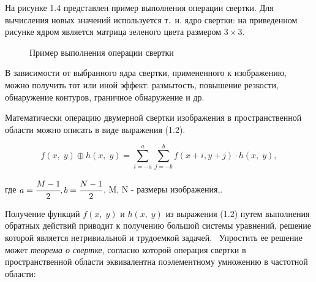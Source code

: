 На рисунке 1.4 представлен пример выполнения операции свертки. Для вычисления новых значений используется т.~н. ядро свертки: на приведенном рисунке ядром является матрица зеленого цвета размером $3\times3$.


\begin{figure}[!h]
	\caption{Пример выполнения операции свертки}
\end{figure}

В зависимости от выбранного ядра свертки, примененного к изображению, можно получить тот или иной эффект: размытость, повышение резкости, обнаружение контуров, граничное обнаружение и др.

Математически операцию двумерной свертки изображения в пространственной области можно описать в виде выражения (1.2).

\begin{equation}
	f(x,\;y) \oplus h(x,\;y) = \sum_{i = -a}^{a} \sum_{j = -b}^{b} f(x + i, y + j) \cdot h(x,\;y),
\end{equation}

где $a = \cfrac{M-1}{2}, b = \cfrac{N-1}{2}$, M, N - размеры изображения,.

Получение функций $f(x,\;y)$ и $h(x,\;y)$ из выражения (1.2) путем выполнения обратных действий приводит к получению большой системы уравнений, решение которой является нетривиальной и трудоемкой задачей.~\cite{teorema} Упростить ее решение может \textit{теорема о свертке}, согласно которой операция свертки в пространственной области эквивалентна поэлементному умножению в частотной области:

